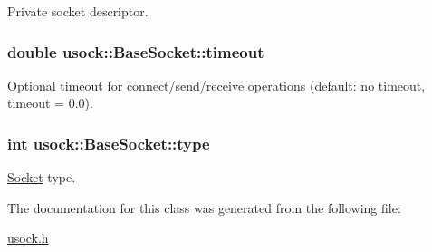 Private socket descriptor. 

\hypertarget{classusock_1_1BaseSocket_b419e8fd0b849c74b73a02d6bd9081e3}{
\subsubsection[{timeout}]{\setlength{\rightskip}{0pt plus 5cm}double {\bf usock::BaseSocket::timeout}}}
\label{classusock_1_1BaseSocket_b419e8fd0b849c74b73a02d6bd9081e3}


Optional timeout for connect/send/receive operations (default: no timeout, timeout = 0.0). 

\hypertarget{classusock_1_1BaseSocket_139a74d163977332762f349a73f4bd64}{
\subsubsection[{type}]{\setlength{\rightskip}{0pt plus 5cm}int {\bf usock::BaseSocket::type}}}
\label{classusock_1_1BaseSocket_139a74d163977332762f349a73f4bd64}


\hyperlink{classusock_1_1Socket}{Socket} type. 



The documentation for this class was generated from the following file:\begin{CompactItemize}
\item 
\hyperlink{usock_8h}{usock.h}\end{CompactItemize}
